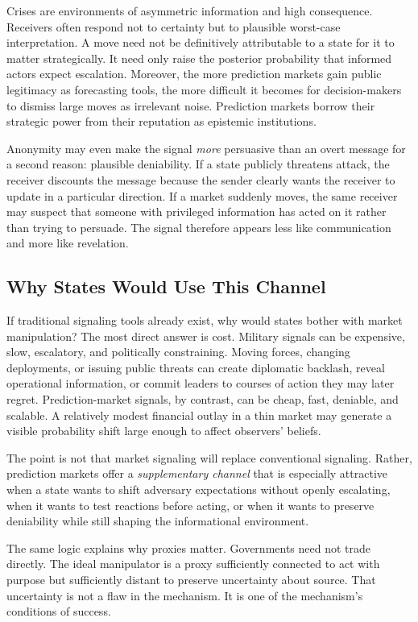 \documentclass[12pt]{article}
\begin{document}
Crises are environments of asymmetric information and high consequence. Receivers often respond not to certainty but to plausible worst-case interpretation. A move need not be definitively attributable to a state for it to matter strategically. It need only raise the posterior probability that informed actors expect escalation. Moreover, the more prediction markets gain public legitimacy as forecasting tools, the more difficult it becomes for decision-makers to dismiss large moves as irrelevant noise. Prediction markets borrow their strategic power from their reputation as epistemic institutions.

Anonymity may even make the signal \textit{more} persuasive than an overt message for a second reason: plausible deniability. If a state publicly threatens attack, the receiver discounts the message because the sender clearly wants the receiver to update in a particular direction. If a market suddenly moves, the same receiver may suspect that someone with privileged information has acted on it rather than trying to persuade. The signal therefore appears less like communication and more like revelation.

\subsection{Why States Would Use This Channel}

If traditional signaling tools already exist, why would states bother with market manipulation? The most direct answer is cost. Military signals can be expensive, slow, escalatory, and politically constraining. Moving forces, changing deployments, or issuing public threats can create diplomatic backlash, reveal operational information, or commit leaders to courses of action they may later regret. Prediction-market signals, by contrast, can be cheap, fast, deniable, and scalable. A relatively modest financial outlay in a thin market may generate a visible probability shift large enough to affect observers' beliefs.

The point is not that market signaling will replace conventional signaling. Rather, prediction markets offer a \textit{supplementary channel} that is especially attractive when a state wants to shift adversary expectations without openly escalating, when it wants to test reactions before acting, or when it wants to preserve deniability while still shaping the informational environment.

The same logic explains why proxies matter. Governments need not trade directly. The ideal manipulator is a proxy sufficiently connected to act with purpose but sufficiently distant to preserve uncertainty about source. That uncertainty is not a flaw in the mechanism. It is one of the mechanism's conditions of success.
\end{document}
